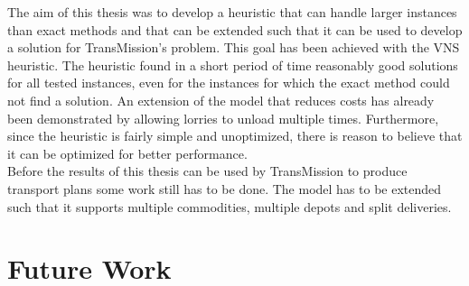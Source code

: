 The aim of this thesis was to develop a heuristic that can handle larger instances than exact methods and that can be extended such that it can be used to develop a solution for  TransMission's problem.
This goal has been achieved with the VNS heuristic.
The heuristic found in a short period of time reasonably good solutions for all tested instances, even for the instances for which the exact method could not find a solution.
An extension of the model that reduces costs has already been demonstrated by allowing lorries to unload multiple times.
Furthermore, since the heuristic is fairly simple and unoptimized, there is reason to believe that it can be optimized for better performance. \\


Before the results of this thesis can be used by TransMission to produce transport plans some work still has to be done.
The model has to be extended such that it supports multiple commodities, multiple depots and split deliveries.

%
%
%
%
%
%

\section{Future Work}
\label{chap:future-work}


